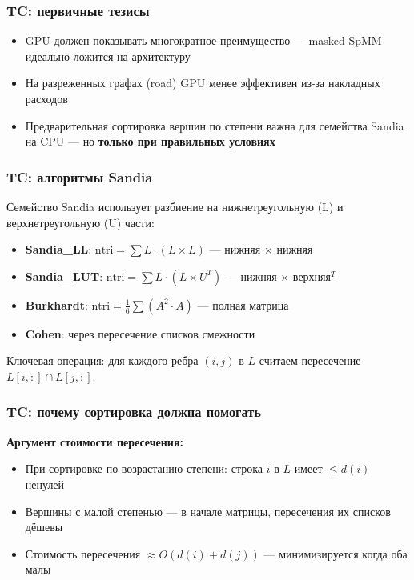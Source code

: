 \documentclass{beamer}
\begin{document}
\begin{frame}
  \frametitle{TC: первичные тезисы}
  \begin{itemize}
    \item GPU должен показывать многократное преимущество --- masked SpMM идеально ложится на архитектуру
    \item На разреженных графах (road) GPU менее эффективен из-за накладных расходов
    \item Предварительная сортировка вершин по степени важна для семейства Sandia на CPU ---
          но \textbf{только при правильных условиях}
  \end{itemize}
\end{frame}

\begin{frame}
  \frametitle{TC: алгоритмы Sandia}
  Семейство Sandia использует разбиение на нижнетреугольную (L) и верхнетреугольную (U) части:
  \begin{itemize}
    \item \textbf{Sandia\_LL}: $\text{ntri} = \sum L \cdot (L \times L)$ --- нижняя $\times$ нижняя
    \item \textbf{Sandia\_LUT}: $\text{ntri} = \sum L \cdot (L \times U^T)$ --- нижняя $\times$ верхняя$^T$
    \item \textbf{Burkhardt}: $\text{ntri} = \frac{1}{6}\sum (A^2 \cdot A)$ --- полная матрица
    \item \textbf{Cohen}: через пересечение списков смежности
  \end{itemize}

  Ключевая операция: для каждого ребра $(i,j)$ в $L$ считаем пересечение $L[i,:] \cap L[j,:]$.
\end{frame}

\begin{frame}
  \frametitle{TC: почему сортировка должна помогать}
  \textbf{Аргумент стоимости пересечения:}
  \begin{itemize}
    \item При сортировке по возрастанию степени: строка $i$ в $L$ имеет $\leq d(i)$ ненулей
    \item Вершины с малой степенью --- в начале матрицы, пересечения их списков дёшевы
    \item Стоимость пересечения $\approx O(d(i) + d(j))$ --- минимизируется когда оба малы
  \end{itemize}
\end{frame}
\end{document}

